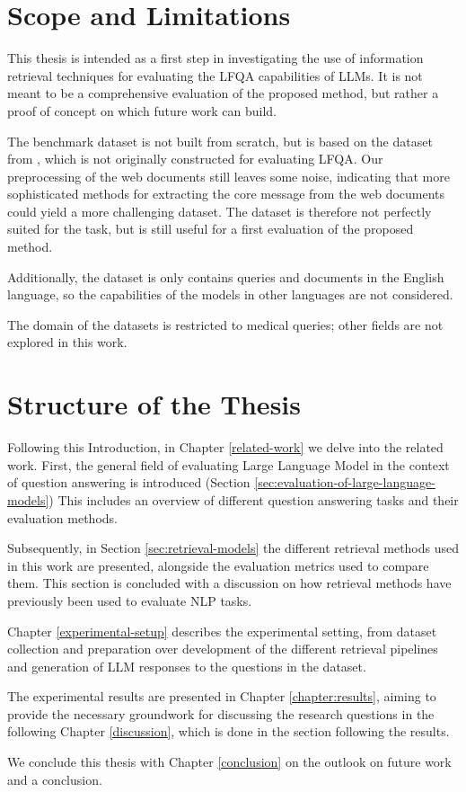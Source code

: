 \section{Scope and Limitations}\label{sec:scope-and-limitations}
This thesis is intended as a first step in investigating the use of information retrieval techniques for evaluating the LFQA capabilities of LLMs.
It is not meant to be a comprehensive evaluation of the proposed method, but rather a proof of concept on which future work can build.

The benchmark dataset is not built from scratch, but is based on the dataset from \cite{goeuriot:2021:Consumer}, which is not originally constructed for evaluating LFQA.
Our preprocessing of the web documents still leaves some noise, indicating that more sophisticated methods for extracting the core message from the web documents could yield a more challenging dataset.
The dataset is therefore not perfectly suited for the task, but is still useful for a first evaluation of the proposed method.

Additionally, the dataset is only contains queries and documents in the English language, so the capabilities of the models in other languages are not considered.

The domain of the datasets is restricted to medical queries; other fields are not explored in this work.

\section{Structure of the Thesis}\label{sec:structure-of-the-thesis}
Following this Introduction, in Chapter \ref{related-work} we delve into the related work.
First, the general field of evaluating Large Language Model in the context of question answering is introduced (Section \ref{sec:evaluation-of-large-language-models})
This includes an overview of different question answering tasks and their evaluation methods.

Subsequently, in Section \ref{sec:retrieval-models} the different retrieval methods used in this work are presented, alongside the evaluation metrics used to compare them.
This section is concluded with a discussion on how retrieval methods have previously been used to evaluate NLP tasks.

Chapter \ref{experimental-setup} describes the experimental setting, from dataset collection and preparation over development of the different retrieval pipelines and generation of LLM responses to the questions in the dataset.

The experimental results are presented in Chapter \ref{chapter:results}, aiming to provide the necessary groundwork for discussing the research questions in the following Chapter \ref{discussion}, which is done in the section following the results.

We conclude this thesis with Chapter \ref{conclusion} on the outlook on future work and a conclusion.